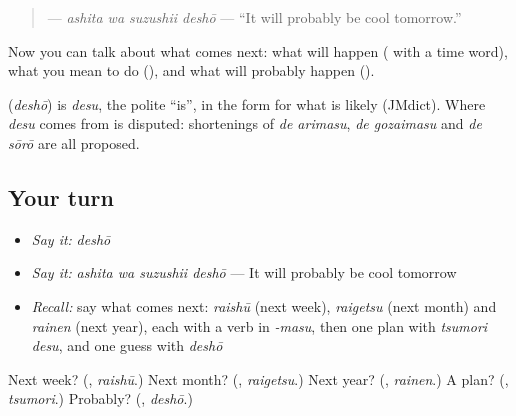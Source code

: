 \begin{quote}
\textbf{ } — \emph{ashita wa suzushii deshō} — \textquotedblleft{}It will probably be cool tomorrow.\textquotedblright{}
\end{quote}

Now you can talk about what comes next: what will happen (\textbf{} with a time word), what you mean to do (\textbf{}), and what will probably happen (\textbf{}).

\begin{cousinweb}
\textbf{} (\emph{deshō}) is \emph{desu}, the polite \textquotedblleft{}is\textquotedblright{}, in the form for what is likely (JMdict). Where \emph{desu} comes from is disputed: shortenings of \emph{de arimasu}, \emph{de gozaimasu} and \emph{de sōrō} are all proposed.
\end{cousinweb}

\subsection*{Your turn}
\begin{itemize}
\raggedright
  \item \emph{Say it:} \emph{deshō}
  \item \emph{Say it:} \emph{ashita wa suzushii deshō} — It will probably be cool tomorrow
  \item \emph{Recall:} say what comes next: \emph{raishū} (next week), \emph{raigetsu} (next month) and \emph{rainen} (next year), each with a verb in \emph{-masu}, then one plan with \emph{tsumori desu}, and one guess with \emph{deshō}
\end{itemize}

\begin{tcolorbox}[breakable,colback=teal!4,colframe=teal!35!black,title={Before you move on}]
Next week? (\textbf{}, \emph{raishū}.) Next month? (\textbf{}, \emph{raigetsu}.) Next year? (\textbf{}, \emph{rainen}.) A plan? (\textbf{}, \emph{tsumori}.) Probably? (\textbf{}, \emph{deshō}.)
\end{tcolorbox}
